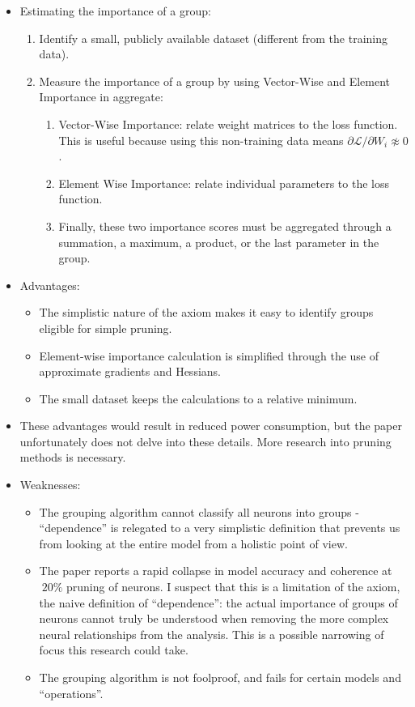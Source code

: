 \begin{itemize}
\begin{itemize}
        \item Estimating the importance of a group:
        \begin{enumerate}
            \item Identify a small, publicly available dataset (different from the training data).
            \item Measure the importance of a group by using Vector-Wise and Element Importance in aggregate:
            \begin{enumerate}
                \item Vector-Wise Importance: relate weight matrices to the loss function.
                This is useful because using this non-training data means ${\partial \mathcal{L}}/{\partial W_i} \not \approx 0$.
                \item Element Wise Importance: relate individual parameters to the loss function.
                \item Finally, these two importance scores must be aggregated through a summation, a maximum, a product, or the last parameter in the group.
            \end{enumerate}
        \end{enumerate}
        \item Advantages:
        \begin{itemize}
            \item The simplistic nature of the axiom makes it easy to identify groups eligible for simple pruning.
            \item Element-wise importance calculation is simplified through the use of approximate gradients and Hessians.
            \item The small dataset keeps the calculations to a relative minimum.
        \end{itemize}
        \item These advantages would result in reduced power consumption, but the paper unfortunately does not delve into these details.
        More research into pruning methods is necessary.
        \item Weaknesses:
        \begin{itemize}
            \item The grouping algorithm cannot classify all neurons into groups - ``dependence'' is relegated to a very simplistic definition that prevents us from looking at the entire model from a holistic point of view.
            \item The paper reports a rapid collapse in model accuracy and coherence at $~20\%$ pruning of neurons.
             I suspect that this is a limitation of the axiom, the naive definition of ``dependence'':
             the actual importance of groups of neurons cannot truly be understood when removing the more complex neural relationships from the analysis.
             This is a possible narrowing of focus this research could take.
            \item The grouping algorithm is not foolproof, and fails for certain models and ``operations''\cite{LLM-Pruner}.
        \end{itemize}
    \end{itemize}
\end{itemize}